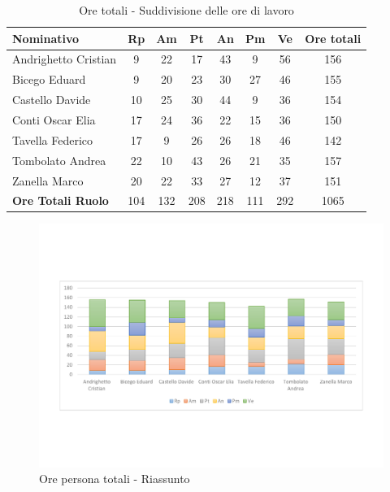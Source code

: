 \documentclass[../PianoProgetto.tex]{subfiles}
\begin{document}
	\begin{table}[h]
		\begin{tabularx}{\textwidth}{l  * {6}{C}  c}
			\toprule
			\textbf{Nominativo} & \textbf{Rp} & \textbf{Am} & \textbf{Pt} 
						& \textbf{An} & \textbf{Pm} & \textbf{Ve} & \textbf{Ore totali} \\
			\midrule
			Andrighetto Cristian & 9 & 22 & 17 & 43 & 9 & 56 &	156 \\
			Bicego Eduard & 9 & 20 & 23 & 30 & 27 & 46 & 155 \\
			Castello Davide & 10 & 25 & 30 & 44 & 9 & 36 & 154 \\
			Conti Oscar Elia & 17 & 24 & 36 & 22 & 15 & 36 & 150 \\
			Tavella Federico &	17 & 9 & 26 & 26 & 18 & 46 & 142 \\
			Tombolato Andrea & 22 & 10 & 43 & 26 & 21 & 35 & 157 \\
			Zanella Marco & 20 & 22 & 33 & 27 & 12 & 37 & 151 \\
			\midrule			
			\textbf{Ore Totali Ruolo} & 104 & 132 & 208 & 218 & 111 & 292 & 1065 \\
			\bottomrule
		\end{tabularx}
		\caption{Ore totali - Suddivisione delle ore di lavoro}
		\label{tab:totale_ore}
	\end{table}
	
\newpage
\vfill
		
	\begin{figure}[!h]
		\centering
		\includegraphics[width=\textwidth , trim=2cm 5cm 2cm 5cm]{grafici/Riepilogo/Totali/ore-persona}
			\caption{Ore persona totali - Riassunto}
		\label{fig:BarChart-totale_ore}
	\end{figure}
	
\end{document}
